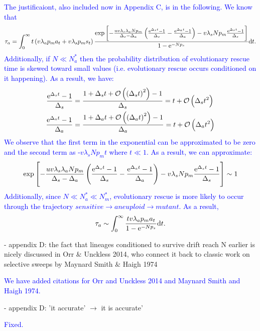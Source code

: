 \documentclass[12pt]{extarticle}
\renewcommand{\d}{{\rm d}}
\newcommand{\e}{{\rm e}}
\begin{document}
\textcolor{blue}{
The justificaiont, also included now in Appendix C, is in the following. 
We know that
\begin{align*}
\tau_a=\int_0^\infty t\left(v\lambda_ap_ma_t+v\lambda_sp_ms_t\right)\frac{\exp\left[-\frac{uv\lambda_s\lambda_aNp_m}{\Delta_s-\Delta_a}\left(\frac{\e^{\Delta_s t}-1}{\Delta_s}-\frac{\e^{\Delta_a t}-1}{\Delta_a}\right)-v\lambda_sNp_m\frac{\e^{\Delta_s t}-1}{\Delta_s}\right] }{1-\e^{-Np_s}}\d t.
\end{align*}
Additionally, if $N\ll N_a^*$ then the probability distribution of evolutionary rescue time is skewed toward small values (i.e. evolutionary rescue occurs conditioned on it happening). As a result, we have: 
\begin{align*}
\frac{\e^{\Delta_s t}-1}{\Delta_s}&=\frac{1+\Delta_s t+\mathcal{O}\left(\left(\Delta_st\right)^2\right)-1}{\Delta_s}=t+\mathcal{O}\left(\Delta_st^2\right)\\
\frac{\e^{\Delta_a t}-1}{\Delta_a}&=\frac{1+\Delta_a t+\mathcal{O}\left(\left(\Delta_at\right)^2\right)-1}{\Delta_a}=t+\mathcal{O}\left(\Delta_at^2\right)
\end{align*}
We observe that the first term in the exponential can be approximated to be zero and the second term as -$v\lambda_sNp_mt$ where $t\ll1$. As a result, we can approximate:
\begin{equation*}
\exp\left[-\frac{uv\lambda_s\lambda_aNp_m}{\Delta_s-\Delta_a}\left(\frac{\e^{\Delta_s t}-1}{\Delta_s}-\frac{\e^{\Delta_a t}-1}{\Delta_a}\right)-v\lambda_sNp_m\frac{\e^{\Delta_s t}-1}{\Delta_s}\right] \sim 1
\end{equation*}
Additionally, since $N\ll N_a^*\ll N_m^*$, evolutionary rescue is more likely to occur through the trajectory $sensitive \rightarrow aneuploid \rightarrow mutant$. As a result,
\begin{equation*}
\tau_a\sim\int_0^\infty \frac{tv\lambda_ap_ma_t}{1-\e^{-Np_s}}\d t.
\end{equation*}
}

- appendix D: the fact that lineages conditioned to survive drift reach N earlier is nicely discussed in Orr $\&$ Unckless 2014, who connect it back to classic work on selective sweeps by Maynard Smith $\&$ Haigh 1974

\textcolor{blue}{We have added citations for Orr and Unckless 2014 and Maynard Smith and Haigh 1974. } %

- appendix D: 'it accurate' $\rightarrow$ it is accurate'

\textcolor{blue}{Fixed.} %
\end{document}
